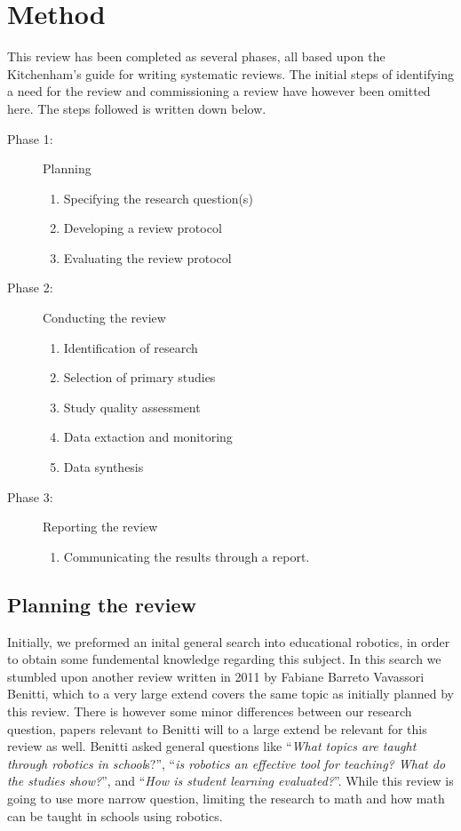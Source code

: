 \section*{Method}
This review has been completed as several phases, all based upon the Kitchenham's guide for writing systematic reviews\cite{kitchenham2007guidelines}. The initial steps of identifying a need for the review and commissioning a review have however been omitted here. The steps followed is written down below.
\begin{description}
	\item[Phase 1: ] Planning
		\begin{enumerate}
			\item Specifying the research question(s)
			\item Developing a review protocol
			\item Evaluating the review protocol
		\end{enumerate}
	\item[Phase 2: ] Conducting the review
		\begin{enumerate}
			\item Identification of research
			\item Selection of primary studies
			\item Study quality assessment
			\item Data extaction and monitoring
			\item Data synthesis
		\end{enumerate}
	\item[Phase 3: ] Reporting the review
		\begin{enumerate}
			\item Communicating the results through a report.
		\end{enumerate}
\end{description}

\subsection*{Planning the review}
Initially, we preformed an inital general search into educational robotics, in order to obtain some fundemental knowledge regarding this subject. In this search we stumbled upon another review written in 2011 by Fabiane Barreto Vavassori Benitti\cite{Benitti2012978}, which to a very large extend covers the same topic as initially planned by this review. There is however some minor differences between our research question, papers relevant to Benitti will to a large extend be relevant for this review as well. Benitti asked general questions like "`\textit{What topics are taught through robotics in school}s?"', "`\textit{is robotics an effective tool for teaching? What do the studies show?}"', and "`\textit{How is student learning evaluated?}"'. While this review is going to use more narrow question, limiting the research to math and how math can be taught in schools using robotics. 
 
